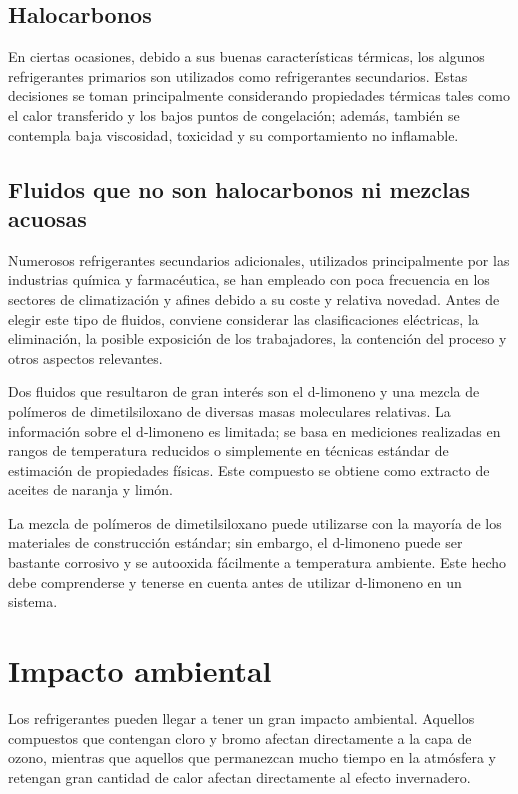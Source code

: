 	\subsection{Halocarbonos}

	En ciertas ocasiones, debido a sus buenas características térmicas, los algunos refrigerantes primarios son utilizados como refrigerantes secundarios. Estas decisiones se toman principalmente considerando propiedades térmicas tales como el calor transferido y los bajos puntos de congelación; además, también se contempla baja viscosidad, toxicidad y su comportamiento no inflamable. 

	\subsection{Fluidos que no son halocarbonos ni mezclas acuosas}

	Numerosos refrigerantes secundarios adicionales, utilizados principalmente por las industrias química y farmacéutica, se han empleado con poca frecuencia en los sectores de climatización y afines debido a su coste y relativa novedad. Antes de elegir este tipo de fluidos, conviene considerar las clasificaciones eléctricas, la eliminación, la posible exposición de los trabajadores, la contención del proceso y otros aspectos relevantes.

	Dos fluidos que resultaron de gran interés son el d-limoneno y una mezcla de polímeros de dimetilsiloxano de diversas masas moleculares relativas. La información sobre el d-limoneno es limitada; se basa en mediciones realizadas en rangos de temperatura reducidos o simplemente en técnicas estándar de estimación de propiedades físicas. Este compuesto se obtiene como extracto de aceites de naranja y limón.

	La mezcla de polímeros de dimetilsiloxano puede utilizarse con la mayoría de los materiales de construcción estándar; sin embargo, el d-limoneno puede ser bastante corrosivo y se autooxida fácilmente a temperatura ambiente. Este hecho debe comprenderse y tenerse en cuenta antes de utilizar d-limoneno en un sistema.
	

	\section{Impacto ambiental}

	Los refrigerantes pueden llegar a tener un gran impacto ambiental. Aquellos compuestos que contengan cloro y bromo afectan directamente a la capa de ozono, mientras que aquellos que permanezcan mucho tiempo en la atmósfera y retengan gran cantidad de calor afectan directamente al efecto invernadero.

